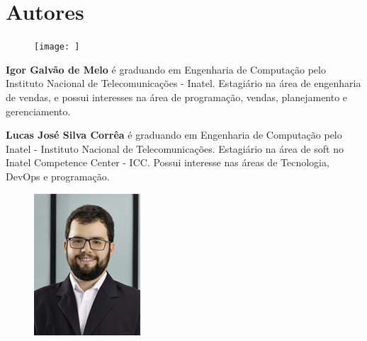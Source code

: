 \section*{Autores}

\begin{figure}
\texttt{[image: ]}  
\end{figure}

\textbf{Igor Galvão de Melo} é graduando em Engenharia de Computação pelo Instituto Nacional de Telecomunicações - Inatel. Estagiário na área de engenharia de vendas, e possui interesses na área de programação, vendas, planejamento e gerenciamento.

\begin{figure}
\end{figure}

   \textbf{Lucas José Silva Corrêa} é graduando em Engenharia de Computação pelo Inatel - Instituto Nacional de Telecomunicações. Estagiário na área de soft no Inatel Competence Center - ICC. Possui interesse nas áreas de Tecnologia, DevOps e programação.\newline

\begin{figure}
\includegraphics[width=\linewidth]{figuras/autor5.jpg}  
\end{figure}

